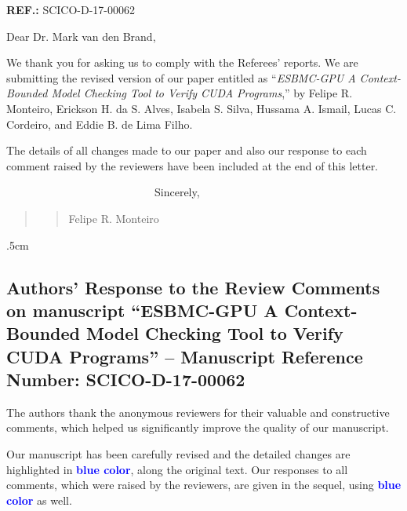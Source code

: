 \documentclass[11pt]{article}
\newcommand\vi{\vspace{\baselineskip}}
\begin{document}
\begin{flushleft}
\textbf{REF.:} SCICO-D-17-00062
    \end{flushleft}
\vi \vi
 
\indent Dear Dr. Mark van den Brand,
\vi 

We thank you for asking us to comply with the Referees' reports. We are submitting the revised version of our paper entitled as ``{\em ESBMC-GPU A Context-Bounded Model Checking Tool to Verify CUDA Programs},'' by Felipe R. Monteiro, Erickson H. da S. Alves, Isabela S. Silva, Hussama A. Ismail, Lucas C. Cordeiro, and Eddie B. de Lima Filho.


The details of all changes made to our paper and also our response to each comment raised by the reviewers have been included at the end of this letter.

\vi\vi

\indent
~~~~~~~~~~~~~~~~~~~~~~~~~~~Sincerely,\\



\begin{quote}
\begin{quote}
\begin{flushright}


\vi
\vi

Felipe R. Monteiro~~~~~~~
\end{flushright}
\end{quote}
\end{quote}

\hoffset -1.5cm \voffset .5cm


\newpage
\subsection*{Authors' Response to the Review Comments on manuscript ``{ESBMC-GPU A Context-Bounded Model Checking Tool to Verify CUDA Programs}'' -- Manuscript Reference Number: SCICO-D-17-00062}

\vi

The authors thank the anonymous reviewers for their valuable and constructive comments, which helped us significantly improve the quality of our manuscript. 

\vi

Our manuscript has been carefully revised and the detailed changes are highlighted in \textcolor{blue}{\bf blue color}, along the original text. Our responses to all comments, which were raised by the reviewers, are given in the sequel, using \textcolor{blue}{\bf blue color} as well.
\end{document}
